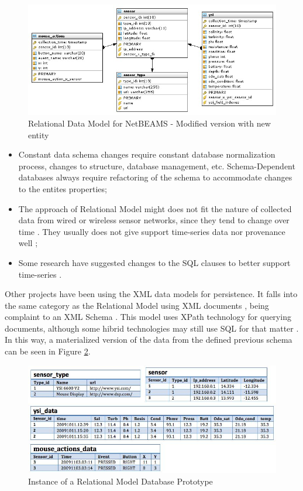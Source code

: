 \begin{figure}
  \centering
  \includegraphics[scale=0.65]{../diagrams/Relational-Model-Addition-Modified}
  \caption{Relational Data Model for NetBEAMS - Modified version with new
  entity}
  \label{fig:Relational-Model-Addition-Modified}
\end{figure}

\begin{itemize}
  \item Constant data schema changes require constant database normalization
  process, changes to structure, database management, etc. Schema-Dependent
  databases always require refactoring of the schema to accommodate changes to
  the entites properties;
  \item The approach of Relational Model might does not fit the nature of
  collected data from wired or wireless sensor networks, since they tend to
  change over time \cite{db-is-rdbs-dommed}. They usually does not give support
  time-series data nor provenance well \cite{sn-provenance};
  \item Some research have suggested changes to the SQL clauses to better
  support time-series \cite{sn-db-newop}.
\end{itemize}

Other projects have been using the XML data models for persistence. It falls
into the same category as the Relational Model using XML documents \cite{xml},
being complaint to an XML Schema \cite{xml-schema}. This model uses XPath
\cite{xml-xpath} technology for querying documents, although some hibrid
technologies may still use SQL \cite{sql} for that matter \cite{db2}. In this
way, a materialized version of the data from the defined previous schema can be
seen in Figure \ref{fig:persistence-example-relational}.

\begin{figure}[!h]
  \centering
  \includegraphics[scale=0.7]{../diagrams/persistence-example-relational}
  \caption{Instance of a Relational Model Database Prototype}
  \label{fig:persistence-example-relational}
\end{figure}

